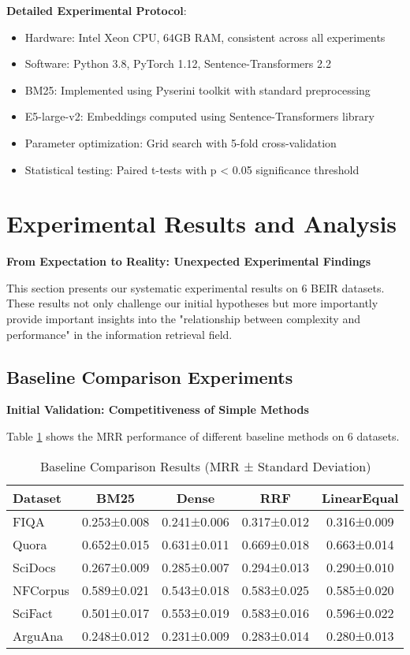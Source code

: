 \documentclass[letterpaper]{article} %
\begin{document}
\textbf{Detailed Experimental Protocol}:
\begin{itemize}
\item Hardware: Intel Xeon CPU, 64GB RAM, consistent across all experiments
\item Software: Python 3.8, PyTorch 1.12, Sentence-Transformers 2.2
\item BM25: Implemented using Pyserini toolkit with standard preprocessing
\item E5-large-v2: Embeddings computed using Sentence-Transformers library
\item Parameter optimization: Grid search with 5-fold cross-validation
\item Statistical testing: Paired t-tests with p < 0.05 significance threshold
\end{itemize}

\section{Experimental Results and Analysis}

\textbf{From Expectation to Reality: Unexpected Experimental Findings}

This section presents our systematic experimental results on 6 BEIR datasets. These results not only challenge our initial hypotheses but more importantly provide important insights into the "relationship between complexity and performance" in the information retrieval field.

\subsection{Baseline Comparison Experiments}

\textbf{Initial Validation: Competitiveness of Simple Methods}

Table \ref{tab:baseline} shows the MRR performance of different baseline methods on 6 datasets.

\begin{table}[t]
\centering
\caption{Baseline Comparison Results (MRR ± Standard Deviation)}
\label{tab:baseline}
\begin{tabular}{lcccc}
\toprule
Dataset & BM25 & Dense & RRF & LinearEqual \\
\midrule
FIQA & 0.253±0.008 & 0.241±0.006 & 0.317±0.012 & 0.316±0.009 \\
Quora & 0.652±0.015 & 0.631±0.011 & 0.669±0.018 & 0.663±0.014 \\
SciDocs & 0.267±0.009 & 0.285±0.007 & 0.294±0.013 & 0.290±0.010 \\
NFCorpus & 0.589±0.021 & 0.543±0.018 & 0.583±0.025 & 0.585±0.020 \\
SciFact & 0.501±0.017 & 0.553±0.019 & 0.583±0.016 & 0.596±0.022 \\
ArguAna & 0.248±0.012 & 0.231±0.009 & 0.283±0.014 & 0.280±0.013 \\
\bottomrule
\end{tabular}
\end{table}
\end{document}
